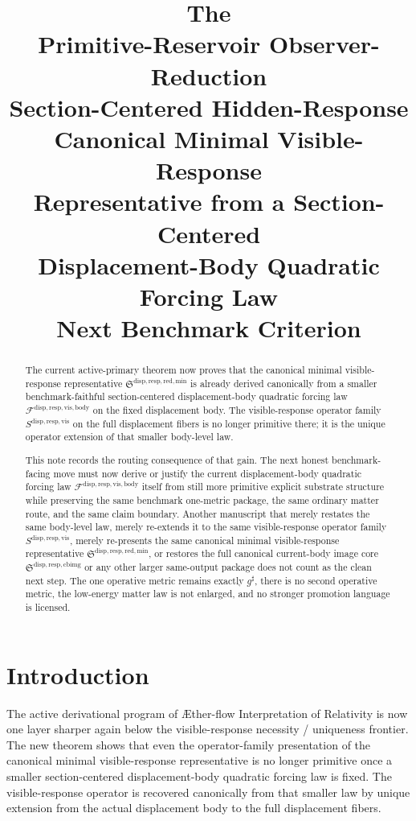 \documentclass[11pt]{article}
\title{\textbf{The \TheoryName{}}\\[0.4em]
\large Primitive-Reservoir Observer-Reduction\\
\large Section-Centered Hidden-Response\\
\large Canonical Minimal Visible-Response\\
\large Representative from a Section-Centered\\
\large Displacement-Body Quadratic Forcing Law\\
\large Next Benchmark Criterion}
\author{}
\date{}
\newcommand{\Aflow}{\AE{}ther-flow}
\newcommand{\TheoryName}{\Aflow{} Interpretation of Relativity}
\newcommand{\CompletedMetric}{g^{\sharp}}
\newcommand{\VisibleBodyForcingLaw}{\mathscr F^{\mathrm{disp,resp,vis,body}}}
\newcommand{\VisibleResponseOperator}{S^{\mathrm{disp,resp,vis}}}
\newcommand{\MinimalReducedStructure}{\mathfrak S^{\mathrm{disp,resp,red,min}}}
\newcommand{\CurrentBodyImageCore}{\mathfrak S^{\mathrm{disp,resp,cbimg}}}
\begin{document}
\maketitle

\begin{abstract}
The current active-primary theorem now proves that the canonical minimal visible-response representative \(\MinimalReducedStructure\) is already derived canonically from a smaller benchmark-faithful section-centered displacement-body quadratic forcing law \(\VisibleBodyForcingLaw\) on the fixed displacement body. The visible-response operator family \(\VisibleResponseOperator\) on the full displacement fibers is no longer primitive there; it is the unique operator extension of that smaller body-level law.

This note records the routing consequence of that gain. The next honest benchmark-facing move must now derive or justify the current displacement-body quadratic forcing law \(\VisibleBodyForcingLaw\) itself from still more primitive explicit substrate structure while preserving the same benchmark one-metric package, the same ordinary matter route, and the same claim boundary. Another manuscript that merely restates the same body-level law, merely re-extends it to the same visible-response operator family \(\VisibleResponseOperator\), merely re-presents the same canonical minimal visible-response representative \(\MinimalReducedStructure\), or restores the full canonical current-body image core \(\CurrentBodyImageCore\) or any other larger same-output package does not count as the clean next step. The one operative metric remains exactly \(\CompletedMetric\), there is no second operative metric, the low-energy matter law is not enlarged, and no stronger promotion language is licensed.
\end{abstract}

\section{Introduction}

The active derivational program of \TheoryName{} is now one layer sharper again below the visible-response necessity / uniqueness frontier. The new theorem shows that even the operator-family presentation of the canonical minimal visible-response representative is no longer primitive once a smaller section-centered displacement-body quadratic forcing law is fixed. The visible-response operator is recovered canonically from that smaller law by unique extension from the actual displacement body to the full displacement fibers.
\end{document}
